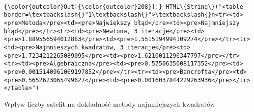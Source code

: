 \documentclass[11pt]{article}
\begin{document}
    \begin{center}
    \end{center}
    { \hspace*{\fill} \\}
    
\begin{Verbatim}[commandchars=\\\{\}]
{\color{outcolor}Out[{\color{outcolor}208}]:} HTML\{String\}("<table border=\textbackslash{}"1\textbackslash{}">\textbackslash{}n<tr><td><pre>Metoda</pre><td><pre>Największy błąd</pre><td><pre>Najmniejszy błąd</pre></tr><tr><td><pre>Newtona, 3 iteracje</pre><td><pre>1.889556594012883</pre><td><pre>1.5515194994109274</pre></tr><tr><td><pre>Najmnieszych kwadratów, 3 iteracje</pre><td><pre>1.7234212265089095</pre><td><pre>1.6210011296347797</pre></tr><tr><td><pre>Algebraiczna</pre><td><pre>0.5750635008117352</pre><td><pre>0.0015140961069197852</pre></tr><tr><td><pre>Bancrofta</pre><td><pre>0.5652623065499627</pre><td><pre>0.0016037844229263936</pre></tr></table>")
\end{Verbatim}
            
    Wpływ liczby satelit na dokładność metody najmniejszych kwadratów
\end{document}
